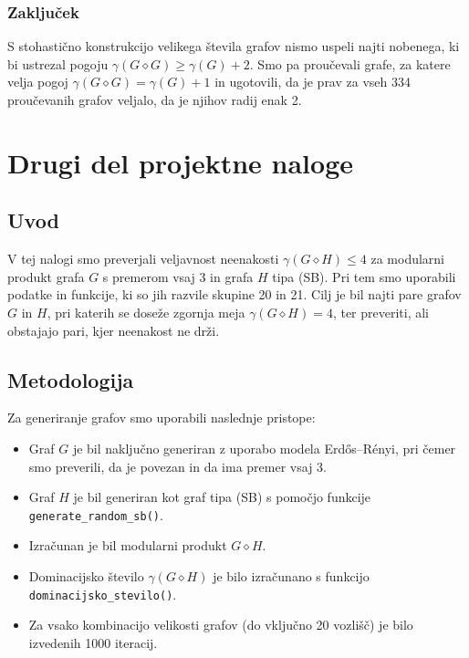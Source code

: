 \documentclass[a4paper,12pt]{article}
\theoremstyle{definition}
\begin{document}
\subsubsection{Zaključek}
S stohastično konstrukcijo velikega števila grafov nismo uspeli najti nobenega, ki bi ustrezal pogoju $\gamma(G \diamond G) \geq \gamma(G) + 2$. Smo pa proučevali grafe, za katere velja pogoj $\gamma(G \diamond G) = \gamma(G) + 1$ in ugotovili, da je prav za vseh 334 proučevanih grafov veljalo, da je njihov radij enak 2.








\section{Drugi del projektne naloge}

\subsection{Uvod}
V tej nalogi smo preverjali veljavnost neenakosti $\gamma(G \diamond H) \leq 4$ za modularni produkt grafa $G$ s premerom vsaj 3 in grafa $H$ tipa (SB). Pri tem smo uporabili podatke in funkcije, ki so jih razvile skupine 20 in 21. Cilj je bil najti pare grafov $G$ in $H$, pri katerih se doseže zgornja meja $\gamma(G \diamond H) = 4$, ter preveriti, ali obstajajo pari, kjer neenakost ne drži.

\subsection{Metodologija}
Za generiranje grafov smo uporabili naslednje pristope:
\begin{itemize}
    \item Graf $G$ je bil naključno generiran z uporabo modela Erdős–Rényi, pri čemer smo preverili, da je povezan in da ima premer vsaj 3.
    \item Graf $H$ je bil generiran kot graf tipa (SB) s pomočjo funkcije \texttt{generate\_random\_sb()}.
    \item Izračunan je bil modularni produkt $G \diamond H$.
    \item Dominacijsko število $\gamma(G \diamond H)$ je bilo izračunano s funkcijo \texttt{dominacijsko\_stevilo()}.
    \item Za vsako kombinacijo velikosti grafov (do vključno 20 vozlišč) je bilo izvedenih 1000 iteracij.
\end{itemize}
\end{document}

